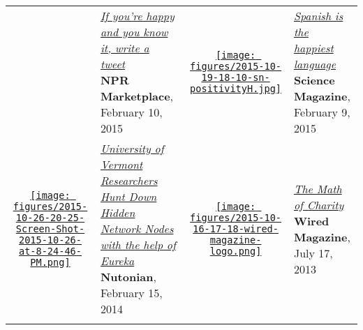 \begin{longtable}{c p{7.5cm} c p{7.5cm} }
& \parbox[c]{7.5cm}{ {\small \textcolor{blue}{\textit{\href{http://www.marketplace.org/topics/tech/if-youre-happy-and-you-know-it-write-tweet} {If you're happy and you know it, write a tweet} } } }\\ \textbf{NPR Marketplace}, February 10, 2015 }  &  
\parbox[c]{1.1cm}{ \href{http://news.sciencemag.org/social-sciences/2015/02/spanish-happiest-language-chinese-not-so-much}{\texttt{[image: figures/2015-10-19-18-10-sn-positivityH.jpg]}} }
& \parbox[c]{7.5cm}{ {\small \textcolor{blue}{\textit{\href{http://news.sciencemag.org/social-sciences/2015/02/spanish-happiest-language-chinese-not-so-much} {Spanish is the happiest language} } } }\\ \textbf{Science Magazine}, February 9, 2015 }  \\
\rule{0pt}{5ex} 
\parbox[c]{1.1cm}{ \href{http://www.nutonian.com/assets/nutonian-uvm.pdf}{\texttt{[image: figures/2015-10-26-20-25-Screen-Shot-2015-10-26-at-8-24-46-PM.png]}} }
& \parbox[c]{7.5cm}{ {\small \textcolor{blue}{\textit{\href{http://www.nutonian.com/assets/nutonian-uvm.pdf} {University of Vermont Researchers Hunt Down Hidden Network Nodes with the help of Eureka} } } }\\ \textbf{Nutonian}, February 15, 2014 }  &  
\parbox[c]{1.1cm}{ \href{http://www.wired.com/2013/07/the-math-of-charity/}{\texttt{[image: figures/2015-10-16-17-18-wired-magazine-logo.png]}} }
& \parbox[c]{7.5cm}{ {\small \textcolor{blue}{\textit{\href{http://www.wired.com/2013/07/the-math-of-charity/} {The Math of Charity} } } }\\ \textbf{Wired Magazine}, July 17, 2013 }  \\
\rule{0pt}{5ex} 
 \end{longtable}
